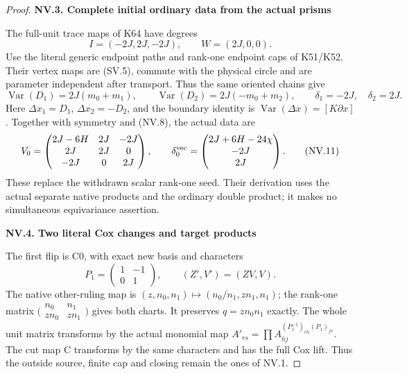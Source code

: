 \begin{proof}
\par

\medskip\noindent\textbf{NV.3. Complete initial ordinary data from the actual prisms}

\par\nobreak

The full-unit trace maps of K64 have degrees
\[
 I=(-2J,2J,-2J),\qquad W=(2J,0,0).
\tag{NV.9}
\]
Use the literal generic endpoint paths and rank-one endpoint caps of
K51/K52. Their vertex maps are (SV.5), commute with the physical
circle and are parameter independent after transport. Thus the same
oriented chains give
\[
 \operatorname{Var}(D_1)=2J(m_0+m_1),\qquad
 \operatorname{Var}(D_2)=2J(-m_0+m_2),\qquad
 \delta_1=-2J,\quad\delta_2=2J.
\tag{NV.10}
\]
Here \(\Delta x_1=D_1\), \(\Delta x_2=-D_2\), and the boundary
identity is \(\operatorname{Var}(\Delta x)=[K\partial x]\).
Together with symmetry and (NV.8), the actual data are
\[
 V_0=\begin{pmatrix}
 2J-6H&2J&-2J\\2J&2J&0\\-2J&0&2J
 \end{pmatrix},\qquad
 \delta_0^{\rm vec}=
 \begin{pmatrix}2J+6H-24\chi\\-2J\\2J\end{pmatrix}.
\tag{NV.11}
\]
These replace the withdrawn scalar rank-one seed. Their derivation
uses the actual separate native products and the ordinary double
product; it makes no simultaneous equivariance assertion.

\par

\medskip\noindent\textbf{NV.4. Two literal Cox changes and target products}

\par\nobreak

The first flip is C0, with exact new basis and characters
\[
 P_1=\begin{pmatrix}1&-1\\0&1\end{pmatrix},\qquad
 (Z',V')=(ZV,V).
\tag{NV.12}
\]
The native other-ruling map is
\((z,n_0,n_1)\mapsto(n_0/n_1,zn_1,n_1)\); the rank-one matrix
\(\bigl(\begin{smallmatrix}n_0&n_1\\zn_0&zn_1\end{smallmatrix}\bigr)\)
gives both charts. It preserves \(q=zn_0n_1\) exactly. The whole
unit matrix transforms by the actual monomial map
\(A'_{rs}=\prod A_{hj}^{(P_1^{-1})_{rh}(P_1)_{js}}\).
The cut map C transforms by the same characters and has the full Cox
lift. Thus the outside source, finite cap and closing remain the
ones of NV.1.


\end{proof}
